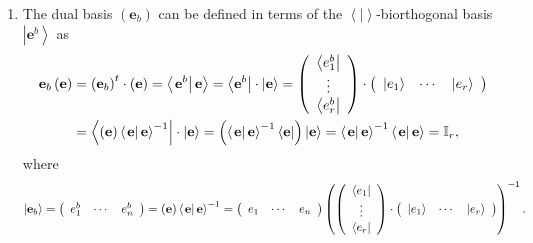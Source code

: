 \documentclass[aps,preprint]{revtex4}%
\begin{document}
\begin{enumerate}
\item The dual basis $\left(  \mathbf{e}_{b}\right)  $ can be defined in terms
of the $\left\langle \left.  {}\right\vert \right\rangle $-biorthogonal basis
$\left\vert \mathbf{e}^{b}\right\rangle $ as
\begin{align}
\mathbf{e}_{b}\left(  \mathbf{e}\right)   &  =\left(  \mathbf{e}_{b}\right)
^{t}\cdot\left(  \mathbf{e}\right)  =\left\langle \left.  \mathbf{e}%
^{b}\right\vert \mathbf{e}\right\rangle =\left\langle \mathbf{e}%
^{b}\right\vert \cdot\left\vert \mathbf{e}\right\rangle =\left(
\begin{array}
[c]{c}%
\left\langle e_{1}^{b}\right\vert \\
\vdots\\
\left\langle e_{r}^{b}\right\vert
\end{array}
\right)  \cdot\left(
\begin{array}
[c]{ccc}%
\left\vert e_{1}\right\rangle  & \cdots & \left\vert e_{r}\right\rangle
\end{array}
\right) \\
&  =\left\langle \left(  \mathbf{e}\right)  \left\langle \left.
\mathbf{e}\right\vert \mathbf{e}\right\rangle ^{-1}\right\vert \cdot\left\vert
\mathbf{e}\right\rangle =\left(  \left\langle \left.  \mathbf{e}\right\vert
\mathbf{e}\right\rangle ^{-1}\left\langle \mathbf{e}\right\vert \right)
\left\vert \mathbf{e}\right\rangle =\left\langle \left.  \mathbf{e}\right\vert
\mathbf{e}\right\rangle ^{-1}\left\langle \left.  \mathbf{e}\right\vert
\mathbf{e}\right\rangle =\mathbb{I}_{r},
\end{align}
where
\[
\left\vert \mathbf{e}_{b}\right\rangle =\left(
\begin{array}
[c]{ccc}%
e_{1}^{b} & \cdots & e_{n}^{b}%
\end{array}
\right)  =\left(  \mathbf{e}\right)  \left\langle \left.  \mathbf{e}%
\right\vert \mathbf{e}\right\rangle ^{-1}=\left(
\begin{array}
[c]{ccc}%
e_{1} & \cdots & e_{n}%
\end{array}
\right)  \left(  \left(
\begin{array}
[c]{c}%
\left\langle e_{1}\right\vert \\
\vdots\\
\left\langle e_{r}\right\vert
\end{array}
\right)  \cdot\left(
\begin{array}
[c]{ccc}%
\left\vert e_{1}\right\rangle  & \cdots & \left\vert e_{r}\right\rangle
\end{array}
\right)  \right)  ^{-1}.
\]



\end{enumerate}
\end{document}
